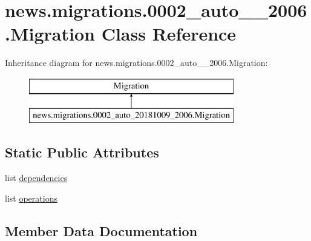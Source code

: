 \hypertarget{classnews_1_1migrations_1_10002__auto__20181009__2006_1_1_migration}{}\section{news.\+migrations.0002\+\_\+auto\+\_\+\_\+2006.Migration Class Reference}
\label{classnews_1_1migrations_1_10002__auto__20181009__2006_1_1_migration}
Inheritance diagram for news.\+migrations.0002\+\_\+auto\+\_\+\_\+2006.Migration\+:\begin{figure}[H]
\begin{center}
\leavevmode
\includegraphics[height=2.000000cm]{classnews_1_1migrations_1_10002__auto__20181009__2006_1_1_migration}
\end{center}
\end{figure}
\subsection*{Static Public Attributes}
\begin{DoxyCompactItemize}
\item 
list \mbox{\hyperlink{classnews_1_1migrations_1_10002__auto__20181009__2006_1_1_migration_aa1978d83bfabe6b651534ac6ef626963}{dependencies}}
\item 
list \mbox{\hyperlink{classnews_1_1migrations_1_10002__auto__20181009__2006_1_1_migration_a243cfcb5672fe1a8555d980b0521dafa}{operations}}
\end{DoxyCompactItemize}


\subsection{Member Data Documentation}
\mbox{\label{classnews_1_1migrations_1_10002__auto__20181009__2006_1_1_migration_aa1978d83bfabe6b651534ac6ef626963}} 

